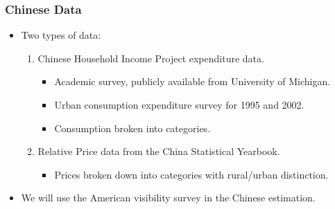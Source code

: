 \documentclass{beamer}
\begin{document}
 \begin{frame}
   \frametitle{Chinese Data}
   \begin{itemize}
     \item Two types of data:
     \begin{enumerate}
       \item Chinese Household Income Project expenditure data.
         \begin{itemize}
           \item Academic survey, publicly available from University of Michigan.
           \item Urban consumption expenditure survey for 1995 and 2002.
           \item Consumption broken into categories.
         \end{itemize}
       \item Relative Price data from the China Statistical Yearbook.
         \begin{itemize}
          \item Prices broken down into categories with rural/urban distinction.
         \end{itemize}
     \end{enumerate}
   \item We will use the American visibility survey in the Chinese estimation.
 \end{itemize}
 \end{frame}
\end{document}
